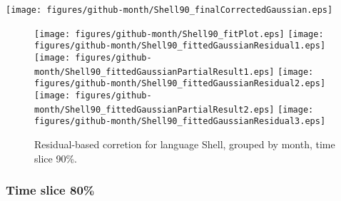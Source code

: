 \begin{center}
{\texttt{[image: figures/github-month/Shell90\_finalCorrectedGaussian.eps]}}
\end{center}

\FloatBarrier

\begin{figure}[t]
\centering
{}
{\texttt{[image: figures/github-month/Shell90\_fitPlot.eps]}}
{\texttt{[image: figures/github-month/Shell90\_fittedGaussianResidual1.eps]}}
{\texttt{[image: figures/github-month/Shell90\_fittedGaussianPartialResult1.eps]}}
{\texttt{[image: figures/github-month/Shell90\_fittedGaussianResidual2.eps]}}
{\texttt{[image: figures/github-month/Shell90\_fittedGaussianPartialResult2.eps]}}
{\texttt{[image: figures/github-month/Shell90\_fittedGaussianResidual3.eps]}}
\caption{Residual-based corretion for language Shell, grouped by month, time slice 90\%.}
\end{figure}


\FloatBarrier


\subsubsection{Time slice 80\%}

